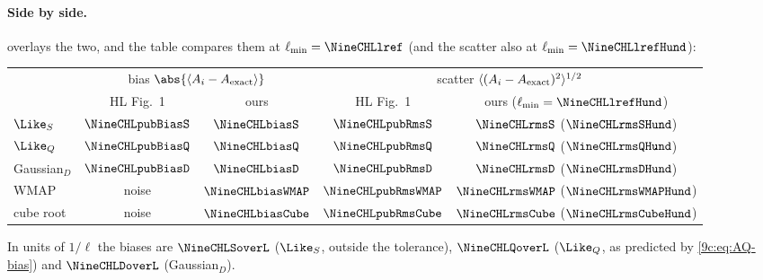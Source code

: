\paragraph{Side by side.}  overlays the two, and the table compares them at
$\ell_{\min}=\NineCHLlref$ (and the scatter also at $\ell_{\min}=\NineCHLlrefHund$):
\begin{center}
\small
\renewcommand{\arraystretch}{1.15}
\begin{tabular}{@{}lcccc@{}}
\toprule
 & \multicolumn{2}{c}{bias $\abs{\langle A_i-A_{\rm exact}\rangle}$} & \multicolumn{2}{c}{scatter $\langle(A_i-A_{\rm exact})^2\rangle^{1/2}$}\\
 & HL Fig.~1 & ours & HL Fig.~1 & ours ($\ell_{\min}=\NineCHLlrefHund$)\\\midrule
$\Like_S$ & $\NineCHLpubBiasS$ & $\NineCHLbiasS$ & $\NineCHLpubRmsS$ & $\NineCHLrmsS$ ($\NineCHLrmsSHund$)\\
$\Like_Q$ & $\NineCHLpubBiasQ$ & $\NineCHLbiasQ$ & $\NineCHLpubRmsQ$ & $\NineCHLrmsQ$ ($\NineCHLrmsQHund$)\\
Gaussian$_D$ & $\NineCHLpubBiasD$ & $\NineCHLbiasD$ & $\NineCHLpubRmsD$ & $\NineCHLrmsD$ ($\NineCHLrmsDHund$)\\
WMAP & noise & $\NineCHLbiasWMAP$ & $\NineCHLpubRmsWMAP$ & $\NineCHLrmsWMAP$ ($\NineCHLrmsWMAPHund$)\\
cube root & noise & $\NineCHLbiasCube$ & $\NineCHLpubRmsCube$ & $\NineCHLrmsCube$ ($\NineCHLrmsCubeHund$)\\
\bottomrule
\end{tabular}
\end{center}
In units of $1/\ell$ the biases are $\NineCHLSoverL$ ($\Like_S$, outside the tolerance), $\NineCHLQoverL$
($\Like_Q$, as predicted by \eqref{9c:eq:AQ-bias}) and $\NineCHLDoverL$ (Gaussian$_D$).

